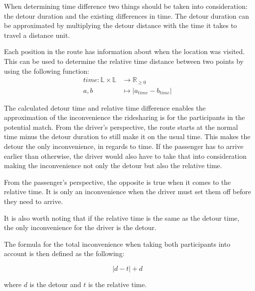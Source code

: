 When determining time difference two things should be taken into consideration: the detour duration and the existing differences in time.
The detour duration can be approximated by multiplying the detour distance with the time it takes to travel a distance unit.

Each position in the route has information about when the location was visited.
This can be used to determine the relative time distance between two points by using the following function:
\begin{align*}
	time : \mathbb{L}\times\mathbb{L} &\rightarrow \mathbb{R}_{\geq 0}\\
	a, b &\mapsto | a_{time} - b_{time} |
\end{align*}

The calculated detour time and relative time difference enables the approximation of the inconvenience the ridesharing is for the participants in the potential match.
From the driver's perspective, the route starts at the normal time minus the detour duration to still make it on the usual time.
This makes the detour the only inconvenience, in regards to time.
If the passenger has to arrive earlier than otherwise, the driver would also have to take that into consideration making the inconvenience not only the detour but also the relative time.

From the passenger's perspective, the opposite is true when it comes to the relative time. 
It is only an inconvenience when the driver must set them off before they need to arrive.

It is also worth noting that if the relative time is the same as the detour time, the only inconvenience for the driver is the detour.

The formula for the total inconvenience when taking both participants into account is then defined as the following:

\[ |d - t| + d \]

where $d$ is the detour and $t$ is the relative time.

\iffalse
Now, let us consider what would happen on the return route.
The situation is now that the driver and passenger want to return to their original locations, but they want to leave at a specific time.
The algorithm already solves this because if a specific arrival time is defined a specific departure time must also be defined.
And the differences in time must be the same.
\fi

